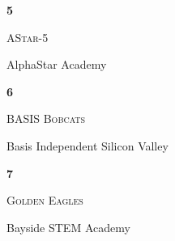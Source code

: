 \documentclass[extrafontsizes,30pt]{memoir}
\begin{document}
\begin{center}
\mbox{}
\vspace{1in}

{\Huge \textbf{ \TeamID}}

\vspace{1in}

{\Large \textsc{\TeamName}}

\vspace{1in}

{\large \SchoolName}
\end{center}

\newpage



\renewcommand{\TeamID}{5}
\renewcommand{\TeamName}{AStar-5}
\renewcommand{\SchoolName}{AlphaStar Academy}

\begin{center}
\mbox{}
\vspace{1in}

{\Huge \textbf{ \TeamID}}

\vspace{1in}

{\Large \textsc{\TeamName}}

\vspace{1in}

{\large \SchoolName}
\end{center}

\newpage



\renewcommand{\TeamID}{6}
\renewcommand{\TeamName}{BASIS Bobcats }
\renewcommand{\SchoolName}{Basis Independent Silicon Valley}

\begin{center}
\mbox{}
\vspace{1in}

{\Huge \textbf{ \TeamID}}

\vspace{1in}

{\Large \textsc{\TeamName}}

\vspace{1in}

{\large \SchoolName}
\end{center}

\newpage



\renewcommand{\TeamID}{7}
\renewcommand{\TeamName}{Golden Eagles}
\renewcommand{\SchoolName}{Bayside STEM Academy}

\begin{center}
\mbox{}
\vspace{1in}

{\Huge \textbf{ \TeamID}}

\vspace{1in}

{\Large \textsc{\TeamName}}

\vspace{1in}

{\large \SchoolName}
\end{center}
\end{document}
